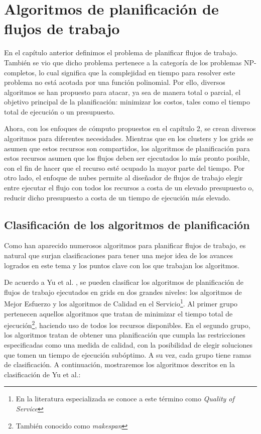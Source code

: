 \chapter[Planificación de flujos de trabajo]{Algoritmos de planificación de flujos de trabajo}
\label{chap:scheduling_algorithms}

En el capítulo anterior definimos el problema de planificar flujos de trabajo. También se vio que dicho problema pertenece a la categoría de los problemas NP-completos, lo cual significa que la complejidad en tiempo para resolver este problema no está acotada por una función polinomial. Por ello, diversos algoritmos se han propuesto para atacar, ya sea de manera total o parcial, el objetivo principal de la planificación: minimizar los costos, tales como el tiempo total de ejecución o un presupuesto.

Ahora, con los enfoques de cómputo propuestos en el capítulo 2, se crean diversos algoritmos para diferentes necesidades. Mientras que en los clusters y los grids se asumen que estos recursos son compartidos, los algoritmos de planificación para estos recursos asumen que los flujos deben ser ejecutados lo más pronto posible, con el fin de hacer que el recurso esté ocupado la mayor parte del tiempo. Por otro lado, el enfoque de nubes permite al diseñador de flujos de trabajo elegir entre ejecutar el flujo con todos los recursos a costa de un elevado presupuesto o, reducir dicho presupuesto a costa de un tiempo de ejecución más elevado.

\section{Clasificación de los algoritmos de planificación}
Como han aparecido numerosos algoritmos para planificar flujos de trabajo, es natural que surjan clasificaciones \cite{topcuoglu2002performance} \cite{yu2008workflow} para tener una mejor idea de los avances logrados en este tema y los puntos clave con los que trabajan los algoritmos.

De acuerdo a Yu et al. \cite{yu2008workflow}, se pueden clasificar los algoritmos de planificación de flujos de trabajo ejecutados en grids en dos grandes niveles: los algoritmos de Mejor Esfuerzo y los algoritmos de Calidad en el Servicio\footnote{En la literatura especializada se conoce a este término como \emph{Quality of Service}}. Al primer grupo pertenecen aquellos algoritmos que tratan de minimizar el tiempo total de ejecución\footnote{También conocido como \emph{makespan}}, haciendo uso de todos los recursos disponibles. En el segundo grupo, los algoritmos tratan de obtener una planificación que cumpla las restricciones especificadas como una medida de calidad, con la posibilidad de elegir soluciones que tomen un tiempo de ejecución subóptimo. A su vez, cada grupo tiene ramas de clasificación. A continuación, mostraremos los algoritmos descritos en la clasificación de Yu et al.: %

